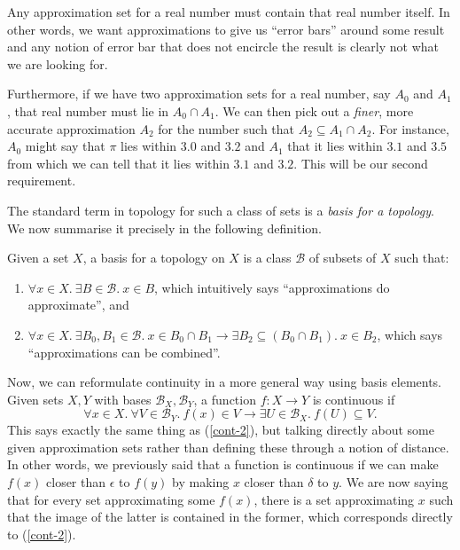 Any approximation set for a real number must contain that real number itself. In other
words, we want approximations to give us ``error bars'' around some result and any notion
of error bar that does not encircle the result is clearly not what we are looking for.

Furthermore, if we have two approximation sets for a real number, say $A_0$ and $A_1$,
that real number must lie in $A_0 \cap A_1$. We can then pick out a \emph{finer}, more
accurate approximation $A_2$ for the number such that $A_2 \subseteq A_1 \cap A_2$. For instance,
$A_0$ might say that $\pi$ lies within $3.0$ and $3.2$ and $A_1$ that it lies within $3.1$
and $3.5$ from which we can tell that it lies within $3.1$ and $3.2$. This will be our
second requirement.

The standard term in topology for such a class of sets is a \emph{basis for a topology}.
We now summarise it precisely in the following definition.
\begin{defn}
  Given a set $X$, a basis for a topology on $X$ is a class $\mathcal{B}$ of subsets of
  $X$ such that:
  \begin{enumerate}
    \item $\forall x \in X.~ \exists B \in \mathcal{B}.~x \in B$, which intuitively says ``approximations do
      approximate'', and
    \item $\forall x \in X.~ \exists B_0, B_1 \in \mathcal{B}.~ x \in B_0 \cap B_1 \rightarrow \exists B_2 \subseteq (B_0 \cap B_1).~
      x \in B_2$, which says ``approximations can be combined''.
  \end{enumerate}
\end{defn}

Now, we can reformulate continuity in a more general way using basis elements. Given sets
$X, Y$ with bases $\mathcal{B}_X, \mathcal{B}_Y$, a function $f : X \rightarrow Y$ is continuous if
\begin{equation}\label{cont-basis}
  \forall x \in X.~ \forall V \in \mathcal{B}_Y.~ f(x) \in V \rightarrow \exists U \in \mathcal{B}_X.~
    f(U) \subseteq V.
\end{equation}
This says exactly the same thing as (\ref{cont-2}), but talking directly about some given
approximation sets rather than defining these through a notion of distance. In other
words, we previously said that a function is continuous if we can make $f(x)$ closer than
$\epsilon$ to $f(y)$ by making $x$ closer than $\delta$ to $y$. We are now saying that for every
set approximating some $f(x)$, there is a set approximating $x$ such that the image of
the latter is contained in the former, which corresponds directly to (\ref{cont-2}).

